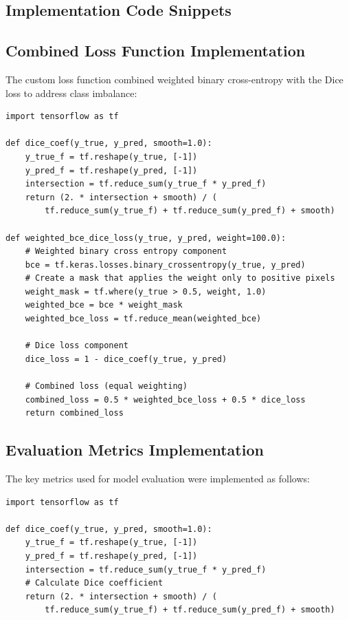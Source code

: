 \begin{theappendices}
  \chapter{Implementation Code Snippets}

  \section{Combined Loss Function Implementation}
  The custom loss function combined weighted binary cross-entropy with the Dice loss to address class imbalance:

\begin{verbatim}
import tensorflow as tf

def dice_coef(y_true, y_pred, smooth=1.0):
    y_true_f = tf.reshape(y_true, [-1])
    y_pred_f = tf.reshape(y_pred, [-1])
    intersection = tf.reduce_sum(y_true_f * y_pred_f)
    return (2. * intersection + smooth) / (
        tf.reduce_sum(y_true_f) + tf.reduce_sum(y_pred_f) + smooth)

def weighted_bce_dice_loss(y_true, y_pred, weight=100.0):
    # Weighted binary cross entropy component
    bce = tf.keras.losses.binary_crossentropy(y_true, y_pred)
    # Create a mask that applies the weight only to positive pixels
    weight_mask = tf.where(y_true > 0.5, weight, 1.0)
    weighted_bce = bce * weight_mask
    weighted_bce_loss = tf.reduce_mean(weighted_bce)

    # Dice loss component
    dice_loss = 1 - dice_coef(y_true, y_pred)

    # Combined loss (equal weighting)
    combined_loss = 0.5 * weighted_bce_loss + 0.5 * dice_loss
    return combined_loss
\end{verbatim}

  \section{Evaluation Metrics Implementation}
  The key metrics used for model evaluation were implemented as follows:

\begin{verbatim}
import tensorflow as tf

def dice_coef(y_true, y_pred, smooth=1.0):
    y_true_f = tf.reshape(y_true, [-1])
    y_pred_f = tf.reshape(y_pred, [-1])
    intersection = tf.reduce_sum(y_true_f * y_pred_f)
    # Calculate Dice coefficient
    return (2. * intersection + smooth) / (
        tf.reduce_sum(y_true_f) + tf.reduce_sum(y_pred_f) + smooth)


\end{verbatim}
\end{theappendices}
